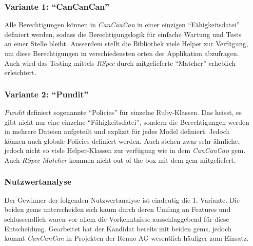 \subsubsection{Variante 1: \enquote{CanCanCan}}

Alle Berechtigungen können in \emph{CanCanCan} in einer einzigen \enquote{Fähigkeitsdatei} definiert werden, sodass die Berechtigungslogik für einfache Wartung und Tests an einer Stelle bleibt. 
Ausserdem stellt die Bibliothek viele Helper zur Verfügung, um diese Berechtigungen in verschiedensten orten der Applikation abzufragen. Auch wird das Testing mittels \emph{RSpec} durch mitgelieferte \enquote{Matcher} erheblich erleichtert.

\subsubsection{Variante 2: \enquote{Pundit}}

\emph{Pundit} definiert sogenannte \enquote{Policies} für einzelne Ruby-Klassen. Das heisst, es gibt nicht nur eine einzelne \enquote{Fähigkeitsdatei},
sondern die Berechtigungen werden in mehrere Dateien aufgeteilt und explizit für jedes Model definiert. Jedoch können auch globale Policies definiert werden.
Auch stehen zwar sehr ähnliche, jedoch nicht so viele Helper-Klassen zur verfügung wie in dem \emph{CanCanCan} gem. Auch \emph{RSpec Matcher} kommen nicht out-of-the-box mit dem gem mitgeliefert.

\subsubsection{Nutzwertanalyse}

Der Gewinner der folgenden Nutzwertanalyse ist eindeutig die 1. Variante. Die beiden gems unterscheiden sich kaum durch deren Umfang an Features und schlussendlich waren vor allem die Vorkenntnisse
ausschlaggebend für diese Entscheidung. Gearbeitet hat der Kandidat bereits mit beiden gems, jedoch kommt \emph{CanCanCan} in Projekten der Renuo AG wesentlich häufiger zum Einsatz.

